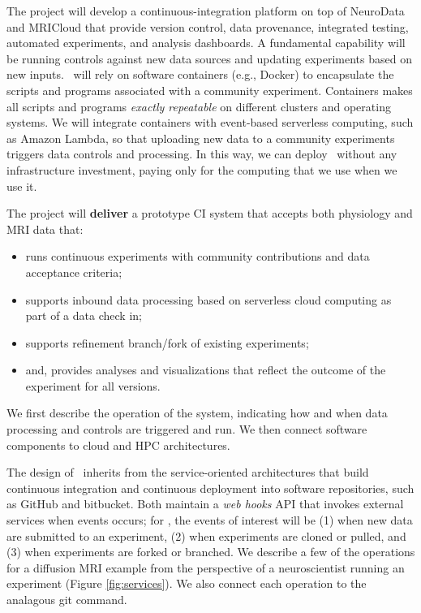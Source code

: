 The project will develop a continuous-integration platform on top of NeuroData \cite{nd} and 
MRICloud that provide 
version control, data provenance, integrated testing, automated experiments, and analysis dashboards.  
A fundamental capability will be running controls against new data sources and updating experiments 
based on new inputs.  \name~will rely on software containers (e.g., Docker) 
to encapsulate the scripts and programs associated with a community experiment.  
Containers makes all scripts and programs {\em exactly repeatable} on different clusters and operating systems.  We will integrate containers with event-based serverless computing, 
such as Amazon Lambda, so that uploading new data to a community experiments triggers data controls and processing.  In this way, 
we can deploy \name~without any infrastructure investment, paying only for the computing that we use when we use it.

The project will {\bf deliver} a prototype CI system that accepts both physiology and MRI data that:
\begin{itemize}
\vspace{-7pt}
\addtolength{\itemsep}{-7pt}
  \item runs continuous experiments with community contributions and data acceptance criteria;
  \item supports inbound data processing based on serverless cloud computing as part of a data check in;
  \item supports refinement branch/fork of existing experiments;
  \item and, provides analyses and visualizations that reflect the outcome of the experiment for all versions. 
\vspace{-10pt}
\end{itemize}
We first describe the operation of the system, indicating how and when data processing and 
controls are triggered and run.  We then connect software components to cloud and HPC
architectures. 


%
The design of \name~inherits from the service-oriented architectures 
that build continuous integration and continuous deployment into software repositories,
such as \textsf{GitHub} and \textsf{bitbucket}.
Both maintain a \emph{web hooks} API that invokes external services when events
occurs; for \name, the events of interest will be (1) when new data are submitted 
to an experiment, (2) when experiments are cloned or pulled, and 
(3) when experiments are forked or branched.
We describe a few of the operations for a diffusion MRI example 
from the perspective 
of a neuroscientist running an experiment (Figure \ref{fig:services}). We also 
connect each operation to the analagous git command.

